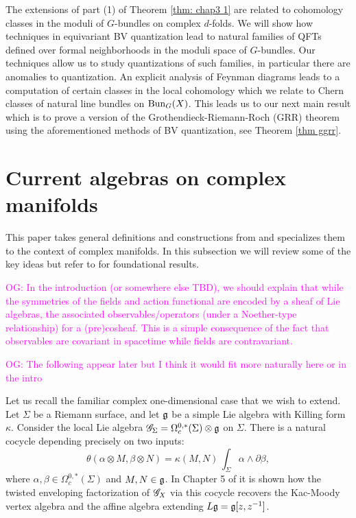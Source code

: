 \documentclass[10pt]{amsart}
\def\owen{\textcolor{magenta}{OG: }\textcolor{magenta}}
\begin{document}
The extensions of part (1) of Theorem \ref{thm: chap3 1} are related to cohomology classes in the moduli of $G$-bundles on complex $d$-folds.
We will show how techniques in equivariant BV quantization lead to natural families of QFTs defined over formal neighborhoods in the moduli space of $G$-bundles. 
Our techniques allow us to study quantizations of such families, in particular there are anomalies to quantization. 
An explicit analysis of Feynman diagrams leads to a computation of certain classes in the local cohomology which we relate to Chern classes of natural line bundles on ${\rm Bun}_G(X)$.
This leads us to our next main result which is to prove a version of the Grothendieck-Riemann-Roch (GRR) theorem using the aforementioned methods of BV quantization, see Theorem \ref{thm ggrr}.


\section{Current algebras on complex manifolds}

This paper takes general definitions and constructions from \cite{CG1} and specializes them to the context of complex manifolds.
In this subsection we will review some of the key ideas but refer to \cite{CG1} for foundational results.

\owen{In the introduction (or somewhere else TBD), we should explain that while the symmetries of the fields and action functional are encoded by a sheaf of Lie algebras, the associated observables/operators (under a Noether-type relationship) for a (pre)cosheaf. This is a simple consequence of the fact that observables are covariant in spacetime while fields are contravariant.}

\owen{The following appear later but I think it would fit more naturally here or in the intro}

Let us recall the familiar complex one-dimensional case that we wish to extend. 
Let $\Sigma$ be a Riemann surface, and let $\mathfrak g$ be a simple Lie algebra with Killing form $\kappa$.
Consider the local Lie algebra $\mathscr G_\Sigma = \Omega^{0,*}_c(\Sigma) \otimes \mathfrak g$ on $\Sigma$.
There is a natural cocycle depending precisely on two inputs:
\[
\theta( \alpha \otimes M, \beta \otimes N) = \kappa(M,N) \, \int_\Sigma \alpha \wedge \partial \beta  ,
\]
where $\alpha, \beta \in \Omega^{0,*}_c(\Sigma)$ and $M,N \in \mathfrak g$.
In Chapter 5 of \cite{CG1} it is shown how the twisted enveloping factorization of $\mathscr G_X$ via this cocycle recovers the Kac-Moody vertex algebra and the affine algebra extending $L\mathfrak g = \mathfrak g[z,z^{-1}]$.
\end{document}
